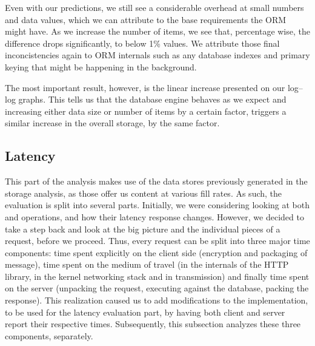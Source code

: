 Even with our predictions, we still see a considerable overhead at small numbers and data values, which we can attribute to the base requirements the ORM might have.
As we increase the number of items, we see that, percentage wise, the difference drops significantly, to below 1\% values.
We attribute those final inconcistencies again to ORM internals such as any database indexes and primary keying that might be happening in the background.

The most important result, however, is the linear increase presented on our log--log graphs.
This tells us that the database engine behaves as we expect and increasing either data size or number of items by a certain factor, triggers a similar increase in the overall storage, by the same factor.

\subsection{Latency}
This part of the analysis makes use of the data stores previously generated in the storage analysis, as those offer us content at various fill rates.
As such, the evaluation is split into several parts.
Initially, we were considering looking at both  and  operations, and how their latency response changes.
However, we decided to take a step back and look at the big picture and the individual pieces of a request, before we proceed.
Thus, every request can be split into three major time components: time spent explicitly on the client side (encryption and packaging of message), time spent on the medium of travel (in the internals of the HTTP library, in the kernel networking stack and in transmission) and finally time spent on the server (unpacking the request, executing against the database, packing the response).
This realization caused us to add modifications to the implementation, to be used for the latency evaluation part, by having both client and server report their respective times.
Subsequently, this subsection analyzes these three components, separately.

